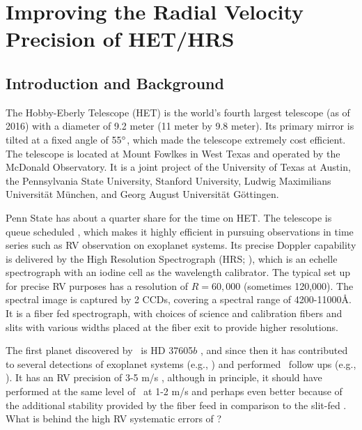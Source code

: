 \chapter{Improving the Radial Velocity Precision of
  HET/HRS}\label{chap:het} 


\section{Introduction and Background}

The Hobby-Eberly Telescope (HET) is the world's fourth largest
telescope (as of 2016) with a diameter of 9.2 meter (11 meter by 9.8
meter). Its primary mirror is tilted at a fixed angle of 55$^{\circ}$,
which made the telescope extremely cost efficient. The telescope is
located at Mount Fowlkes in West Texas and operated by the McDonald
Observatory. It is a joint project of the University of Texas at Austin, the
Pennsylvania State University, Stanford University, Ludwig Maximilians
Universit\"at M\"unchen, and Georg August Universit\"at G\"ottingen.

Penn State has about a quarter share for the time on HET. The
telescope is queue scheduled \citep{hetque2007}, which makes it
highly efficient in pursuing observations in time series such as RV
observation on exoplanet systems. Its precise Doppler capability is
delivered by the High Resolution Spectrograph (HRS;
\citealt{1998SPIE.3355..387T}), which is an echelle spectrograph with
an iodine cell as the wavelength calibrator. The typical set up for
precise RV purposes has a resolution of $R=60,000$ (sometimes
120,000). The spectral image is captured by 2 CCDs, covering a spectral
range of 4200-11000\AA. It is a fiber fed spectrograph, with choices
of science and calibration fibers and slits with various widths
placed at the fiber exit to provide higher resolutions.

The first planet discovered by \het\ is HD 37605$b$
\citep{cochran2004}, and since then it has contributed to several
detections of exoplanet systems (e.g.,
\citealt{2007ApJ...665.1407C,2009ApJS..182...97W,2016A&A...585A..73N})
and performed \kepler\ follow ups (e.g.,
\citealt{2014ApJ...795..151E}). It has an RV precision of 3-5 m/s
\citep{2009MNRAS.393..969B}, although in principle, it should have
performed at the same level of \keck\ at 1-2 m/s and perhaps even
better because of the additional stability provided by the fiber
feed in comparison to the slit-fed \keck. What is behind the high RV
systematic errors of \het? 

